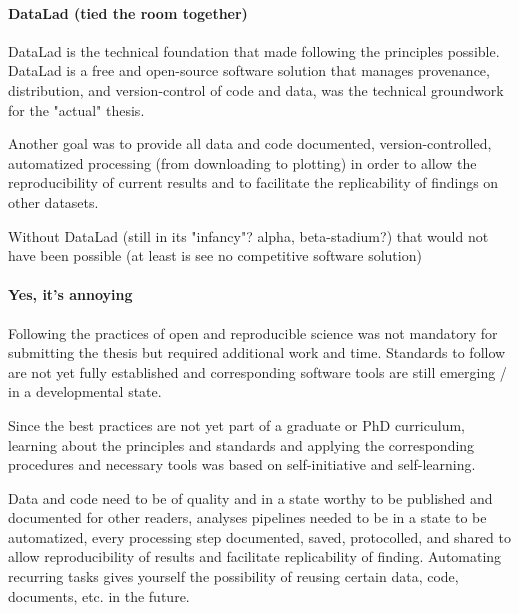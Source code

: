 \paragraph{DataLad (tied the room together)}
%
DataLad \citet{halchenko2021datalad} is the technical foundation that made
following the principles possible.
%
DataLad is a free and open-source software solution
that manages provenance, distribution, and version-control of code and data,
was the technical groundwork for the "actual" thesis.

%
Another goal was to provide all data and code documented, version-controlled,
automatized processing (from downloading to plotting) in order to allow the
reproducibility of current results and to facilitate the replicability of
findings on other datasets.

%
Without DataLad (still in its "infancy"? alpha, beta-stadium?) that would not
have been possible (at least is see no competitive software solution)


\paragraph{Yes, it's annoying}

%
Following the practices of open and reproducible science was not mandatory for
submitting the thesis but required additional work and time.
%
Standards to follow are not yet fully established and corresponding software
tools are still emerging / in a developmental state.

%
Since the best practices are not yet part of a graduate or PhD curriculum,
learning about the principles and standards and applying the corresponding
procedures and necessary tools was based on self-initiative and self-learning.

Data and code need to be of quality and in a state worthy to be published and
documented for other readers, analyses pipelines needed to be in a state to be
automatized, every processing step documented, saved, protocolled, and shared to
allow reproducibility of results and facilitate replicability of finding.
%
Automating recurring tasks gives yourself the possibility of reusing
certain data, code, documents, etc. in the future.




